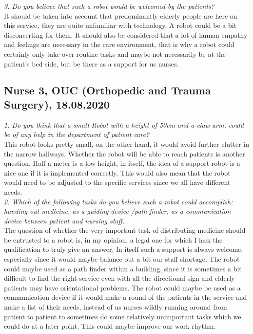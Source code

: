 \documentclass[plainarticle,zihtitle,english,final,hyperref,utf8]{zihpub}
\begin{document}
\begin{appendices}
\newline
\textit{3. Do you believe that such a robot would be welcomed by the patients?}\\
\newline
It should be taken into account that predominantly elderly people are here on this service, they are quite unfamiliar with technology. A robot could be a bit disconcerting for them. It should also be considered that a lot of human empathy and feelings are necessary in the care environment, that is why a robot could certainly only take over routine tasks and maybe not necessarily be at the patient’s bed side, but be there as a support for us nurses. 
\subsection{Nurse 3, OUC (Orthopedic and Trauma Surgery), 18.08.2020}
\textit{1. Do you think that a small Robot with a height of 50cm and a claw arm, could be of any help in the department of patient care?}\\
\newline
This robot looks pretty small, on the other hand, it would avoid further clutter in the narrow hallways. Whether the robot will be able to reach patients is another question. Half a meter is a low height, in itself, the idea of a support robot is a nice one if it is implemented correctly. This would also mean that the robot would need to be adjusted to the specific services since we all have different needs.\\
\newline
\textit{2. Which of the following tasks do you believe such a robot could accomplish: handing out medicine, as a guiding device /path finder, as a communication device between patient and nursing staff.}\\
\newline
The question of whether the very important task of distributing medicine should be entrusted to a robot is, in my opinion, a legal one for which I lack the qualification to truly give an answer. In itself such a support is always welcome, especially since it would maybe balance out a bit our staff shortage. The robot could maybe used as a path finder within a building, since it is sometimes a bit difficult to find the right service even with all the directional sign and elderly patients may have orientational problems. The robot could maybe be used as a communication device if it would make a round of the patients in the service and make a list of their needs, instead of us nurses wildly running around from patient to patient to sometimes do some relatively unimportant tasks which we could do at a later point. This could maybe improve our work rhythm. \\

\end{appendices}
\end{document}
